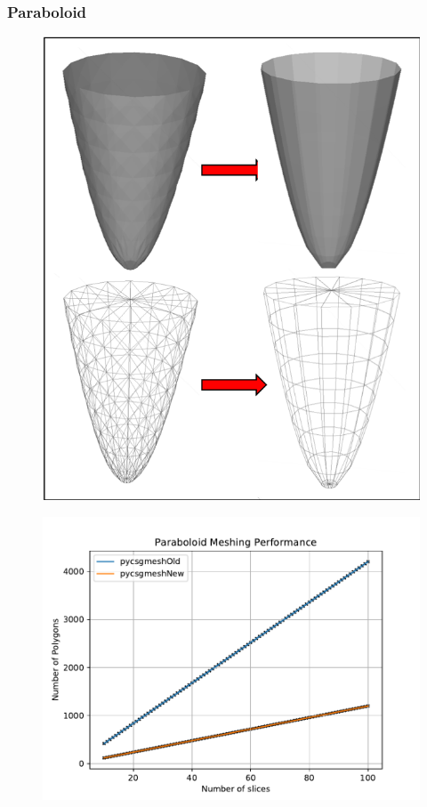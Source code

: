 \documentclass[12pt,a4paper]{article}
\begin{document}
\subsubsection{Paraboloid}

\begin{figure}[h!]
\centering
\begin{minipage}{.2\textwidth}
  \centering
  \includegraphics[height=1\linewidth]{Images//Meshes//paraboloid.png}
  \label{para}
\end{minipage}%
\begin{minipage}{.3\textwidth}
  \centering
  \includegraphics[scale=0.35]{Images//Quad_fits//Paraboloid_quad.pdf}
  \label{fig:test2}
\end{minipage}%
\end{figure}
\end{document}
